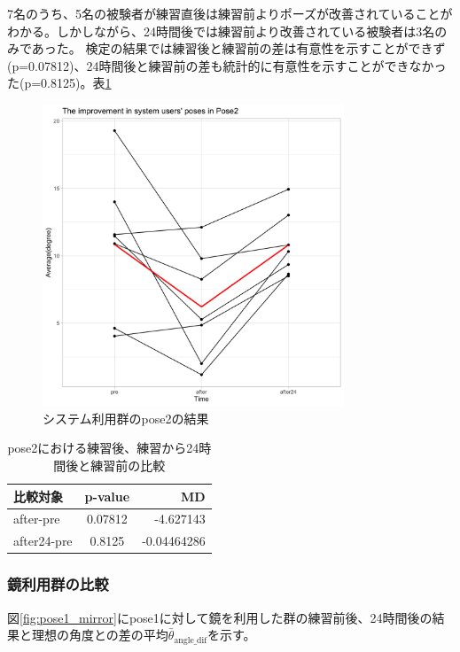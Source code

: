       7名のうち、5名の被験者が練習直後は練習前よりポーズが改善されていることがわかる。しかしながら、24時間後では練習前より改善されている被験者は3名のみであった。
      検定の結果では練習後と練習前の差は有意性を示すことができず(p=0.07812)、24時間後と練習前の差も統計的に有意性を示すことができなかった(p=0.8125)。表\ref{table:pose2_system_p_value}
      \begin{figure}[H]
        \begin{center}
        \includegraphics[width=9cm]{figures/pose2_system_true_graph.png}
        \caption{システム利用群のpose2の結果}
        \label{fig:pose2_system}
        \end{center}
      \end{figure}

      \begin{table}[ht]
        \centering
        \caption{pose2における練習後、練習から24時間後と練習前の比較}
        \begin{tabular}{lcr}
        \hline
        \textbf{比較対象} & \textbf{p-value} & \textbf{MD} \\ \hline
        after-pre & 0.07812 & -4.627143 \\ \hline
        after24-pre & 0.8125 & -0.04464286 \\ \hline
        \end{tabular}
        \label{table:pose2_system_p_value}
        \end{table}
    \subsubsection{鏡利用群の比較}
      図\ref{fig:pose1_mirror}にpose1に対して鏡を利用した群の練習前後、24時間後の結果と理想の角度との差の平均\(\bar{\theta}_{\text{angle\_dif}}\)を示す。


